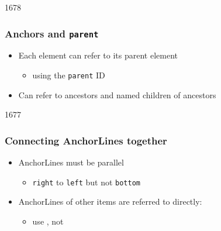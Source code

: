 
\begin{slide}{1678}
\frametitle{Anchors and \texttt{parent}}


\begin{itemize}
\item Each element can refer to its parent element
  \begin{itemize}
  \item using the \texttt{parent} ID
  \end{itemize}
\item Can refer to ancestors and named children of ancestors
\end{itemize}                               


\end{slide}


\begin{slide}{1677}
\frametitle{Connecting AnchorLines together}


\begin{itemize}
\item AnchorLines must be parallel
  \begin{itemize}
  \item \texttt{right} to \texttt{left} but not \texttt{bottom}
  \end{itemize}
\item AnchorLines of other items are referred to directly:
  \begin{itemize}
  \item use , not 
  \end{itemize}
\end{itemize}
\end{slide}


